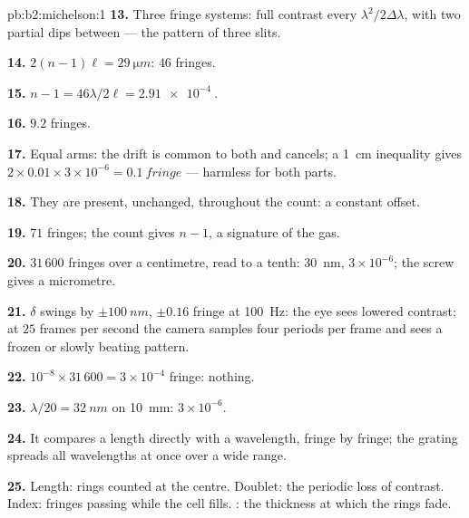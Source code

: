 \begin{solution}{pb:b2:michelson:1}
\textbf{13.} Three fringe systems: full contrast every $\lambda^2/2\Delta\lambda$, with
two partial dips between --- the pattern of three slits.

\textbf{14.} $2(n - 1)\ell = \qty{29}{\micro m}$: $46$ fringes.

\textbf{15.} $n - 1 = 46\lambda/2\ell = \qty{2.91e-4}{}$.

\textbf{16.} $9.2$ fringes.

\textbf{17.} Equal arms: the drift is common to both and cancels; a
\qty{1}{cm} inequality gives $2 \times 0.01 \times 3 \times 10^{-6} = \qty{0.1}{fringe}$ ---
harmless for both parts.

\textbf{18.} They are present, unchanged, throughout the count: a
constant offset.

\textbf{19.} $71$ fringes; the count gives $n - 1$, a signature of the gas.

\textbf{20.} $31\,600$ fringes over a centimetre, read to a tenth:
\qty{30}{nm}, $3 \times 10^{-6}$; the screw gives a micrometre.

\textbf{21.} $\delta$ swings by $\pm\qty{100}{nm}$, $\pm0.16$ fringe at \qty{100}{Hz}: the
eye sees lowered contrast; at $25$ frames per second the camera
samples four periods per frame and sees a frozen or slowly beating
pattern.

\textbf{22.} $10^{-8} \times 31\,600 = 3 \times 10^{-4}$ fringe: nothing.

\textbf{23.} $\lambda/20 = \qty{32}{nm}$ on \qty{10}{mm}: $3 \times 10^{-6}$.

\textbf{24.} It compares a length directly with a wavelength, fringe by
fringe; the grating spreads all wavelengths at once over a wide range.

\textbf{25.} Length: rings counted at the centre. Doublet: the
periodic loss of contrast. Index: fringes passing while the cell
fills. : the thickness at which the rings fade.
\end{solution}
